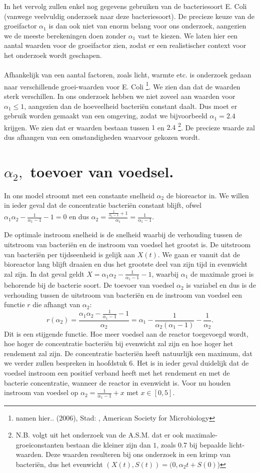 In het vervolg zullen enkel nog gegevens gebruiken van de bacteriesoort E. Coli (vanwege veelvuldig onderzoek naar deze bacteriesoort). De precieze keuze van de groeifactor $\alpha_1$ is dan ook niet van enorm belang voor ons onderzoek, aangezien we de meeste berekeningen doen zonder $\alpha_1$ vast te kiezen. We laten hier een aantal waarden voor de groeifactor zien, zodat er een realistischer context voor het onderzoek wordt geschapen. 
\\
\\
Afhankelijk van een aantal factoren, zoals licht, warmte etc. is onderzoek gedaan naar verschillende groei-waarden voor E. Coli \footnote{namen hier.. (2006), Stad: , American Society for Microbiology}. We zien dan dat de waarden sterk verschillen. In ons onderzoek hebben we niet zoveel aan waarden voor $\alpha_1\leq1$, aangezien dan de hoeveelheid bacteri\"en constant daalt. Dus moet er gebruik worden gemaakt van een omgeving, zodat we bijvoorbeeld $\alpha_1 = 2.4$ krijgen. We zien dat er waarden bestaan tussen $1$ en $2.4$ \footnote{N.B. volgt uit het onderzoek van de A.S.M. dat er ook maximale-groeiconstanten bestaan die kleiner zijn dan $1$, zoals $0.7$ bij bepaalde licht-waarden. Deze waarden resulteren bij ons onderzoek in een krimp van bacteri\"en, dus het evenwicht $(X(t), S(t)) = (0, \alpha_2t + S(0)$) }. De precieze waarde zal dus afhangen van een omstandigheden waarvoor gekozen wordt.


\section{$\alpha_2,$ toevoer van voedsel.}
In ons model stroomt met een constante snelheid $\alpha_2$ de bioreactor in. We willen in ieder geval dat de concentratie bacteri\"en constant blijft, ofwel $\alpha_1\alpha_2-\frac{1}{\alpha_1-1}-1 = 0$ en dus $\alpha_2 = \frac{\frac{1}{\alpha_1-1}+1}{\alpha_1}=\frac{1}{\alpha_1-1}$.

De optimale instroom snelheid is de snelheid waarbij de verhouding tussen de uitstroom van bacteri\"en en de instroom van voedsel het grootst is. De uitstroom van bacteri\"en per tijdseenheid is gelijk aan $X(t)$. We gaan er vanuit dat de bioreactor lang blijft draaien en dus het grootste deel van zijn tijd in evenwicht zal zijn. In dat geval geldt $X = \alpha_1\alpha_2-\frac{1}{\alpha_1-1}-1$, waarbij $\alpha_1$ de maximale groei is behorende bij de bacterie soort. De toevoer van voedsel $\alpha_2$ is variabel en dus is de verhouding tussen de uitstroom van bacteri\"en en de instroom van voedsel een functie $r$ die afhangt van $\alpha_2$:
\[r(\alpha_2) = \frac{\alpha_1\alpha_2-\frac{1}{\alpha_1-1}-1}{\alpha_2} = \alpha_1-\frac{1}{\alpha_2(\alpha_1-1)}-\frac{1}{\alpha_2}.\]
Dit is een stijgende functie. Hoe meer voedsel aan de reactor toegevoegd wordt, hoe hoger de concentratie bacteri\"en bij evenwicht zal zijn en hoe hoger het rendement zal zijn. De concentratie bacteri\"en heeft natuurlijk een maximum, dat we verder zullen bespreken in hoofdstuk 6. Het is in ieder geval duidelijk dat de voedsel instroom een positief verband heeft met het rendement en met de bacterie concentratie, wanneer de reactor in evenwicht is. Voor nu houden instroom van voedsel op $\alpha_2 = \frac{1}{\alpha_1-1} + x$ met $x\in[0, 5]$.

